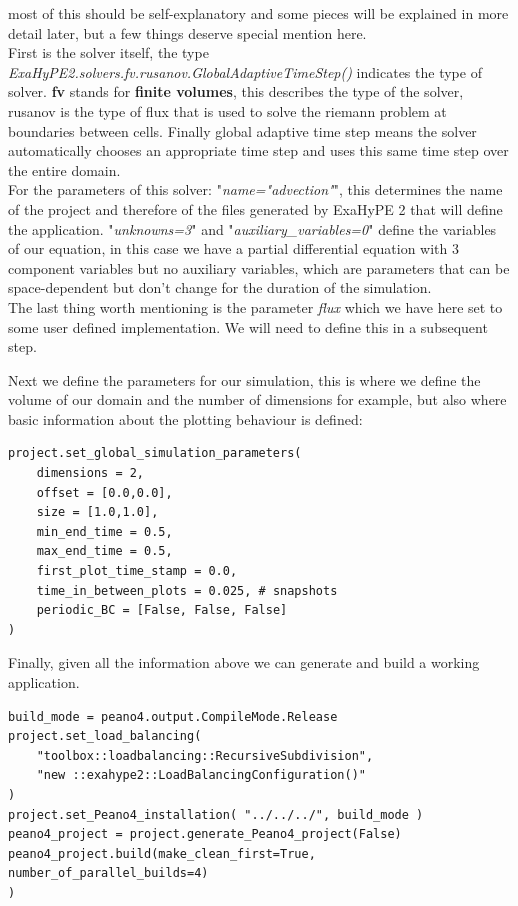 \documentclass[12pt,letterpaper]{article}
\begin{document}
most of this should be self-explanatory and some pieces will be explained in more detail later, but a few things deserve special mention here.\\
First is the solver itself, the type \textit{ExaHyPE2.solvers.fv.rusanov.GlobalAdaptiveTimeStep()} indicates the type of solver. \textbf{fv} stands for \textbf{finite volumes}, this describes the type of the solver, rusanov is the type of flux that is used to solve the riemann problem at boundaries between cells. Finally global adaptive time step means the solver automatically chooses an appropriate time step and uses this same time step over the entire domain.\\
For the parameters of this solver: "\textit{name="advection"}", this determines the name of the project and therefore of the files generated by ExaHyPE 2 that will define the application. "\textit{unknowns=3}" and "\textit{auxiliary\_variables=0}" define the variables of our equation, in this case we have a partial differential equation with 3 component variables but no auxiliary variables, which are parameters that can be space-dependent but don't change for the duration of the simulation.\\ 
The last thing worth mentioning is the parameter \textit{flux} which we have here set to some user defined implementation. We will need to define this in a subsequent step.
\newpage

Next we define the parameters for our simulation, this is where we define the volume of our domain and the number of dimensions for example, but also where basic information about the plotting behaviour is defined:
\begin{lstlisting}[style = Python]
project.set_global_simulation_parameters(
    dimensions = 2,
    offset = [0.0,0.0],
    size = [1.0,1.0],
    min_end_time = 0.5,
    max_end_time = 0.5,
    first_plot_time_stamp = 0.0,
    time_in_between_plots = 0.025, # snapshots
    periodic_BC = [False, False, False]
)
\end{lstlisting}

Finally, given all the information above we can generate and build a working application.

\begin{lstlisting}[style = Python]
build_mode = peano4.output.CompileMode.Release
project.set_load_balancing(
    "toolbox::loadbalancing::RecursiveSubdivision",
    "new ::exahype2::LoadBalancingConfiguration()"
)
project.set_Peano4_installation( "../../../", build_mode )
peano4_project = project.generate_Peano4_project(False)
peano4_project.build(make_clean_first=True, number_of_parallel_builds=4)
)\end{lstlisting}
\end{document}
